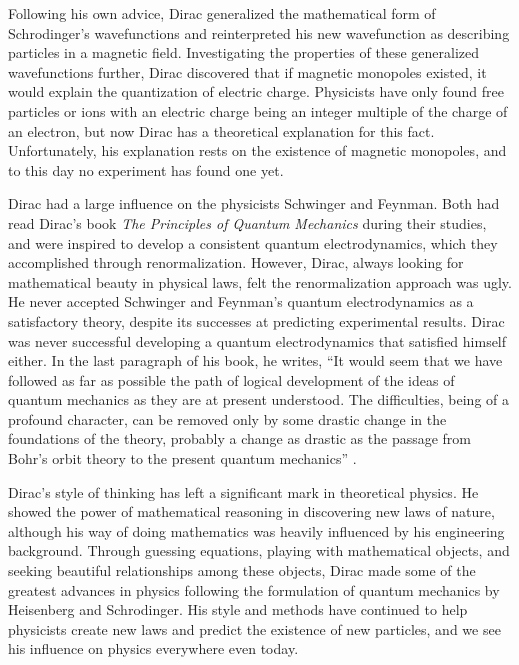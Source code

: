 \documentclass[12pt, oneside, letterpaper, fleqn]{article}
\begin{document}
Following his own advice, Dirac generalized the mathematical form of
Schrodinger's wavefunctions and reinterpreted his new wavefunction as
describing particles in a magnetic field. Investigating the properties
of these generalized wavefunctions further, Dirac discovered that if
magnetic monopoles existed, it would explain the quantization of
electric charge. Physicists have only found free particles or ions with
an electric charge being an integer multiple of the charge of an
electron, but now Dirac has a theoretical explanation for this fact.
Unfortunately, his explanation rests on the existence of magnetic
monopoles, and to this day no experiment has found one yet.

Dirac had a large influence on the physicists Schwinger and Feynman.
Both had read Dirac's book \textit{The Principles of Quantum Mechanics}
during their studies, and were inspired to develop a consistent quantum
electrodynamics, which they accomplished through renormalization.
However, Dirac, always looking for mathematical beauty in physical laws,
felt the renormalization approach was ugly. He never accepted Schwinger
and Feynman's quantum electrodynamics as a satisfactory theory, despite
its successes at predicting experimental results. Dirac was never
successful developing a quantum electrodynamics that satisfied himself
either. In the last paragraph of his book, he writes, ``It would seem
that we have followed as far as possible the path of logical development
of the ideas of quantum mechanics as they are at present understood. The
difficulties, being of a profound character, can be removed only by some
drastic change in the foundations of the theory, probably a change as
drastic as the passage from Bohr's orbit theory to the present quantum
mechanics'' \cite[pg. 310]{principles}.

Dirac's style of thinking has left a significant mark in theoretical
physics. He showed the power of mathematical reasoning in discovering
new laws of nature, although his way of doing mathematics was heavily
influenced by his engineering background. Through guessing equations,
playing with mathematical objects, and seeking beautiful relationships
among these objects, Dirac made some of the greatest advances in physics
following the formulation of quantum mechanics by Heisenberg and
Schrodinger. His style and methods have continued to help physicists
create new laws and predict the existence of new particles, and we see
his influence on physics everywhere even today.

\nocite{*}
%


\end{document}
